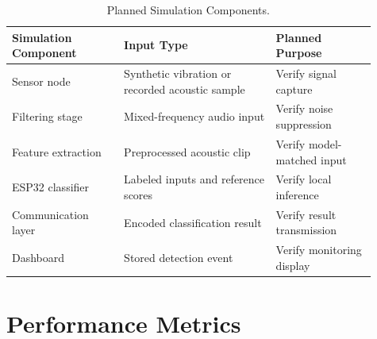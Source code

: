 \documentclass[12pt,a4paper,oneside]{memoir}
\newcommand{\newrevision}[1]{#1}
\begin{document}
\begin{table}[h]
\centering
\caption{Planned Simulation Components.}
\label{tab:simulation}
\renewcommand{\arraystretch}{1.3}
\begin{tabular}{@{} p{0.28\linewidth} p{0.38\linewidth} p{0.25\linewidth} @{}}
\toprule
\textbf{Simulation Component} & \textbf{Input Type} & \textbf{Planned Purpose} \\
\midrule
Sensor node        & Synthetic vibration or recorded acoustic sample & Verify signal capture \\
Filtering stage    & Mixed-frequency audio input                     & Verify noise suppression \\
\newrevision{Feature extraction} & \newrevision{Preprocessed acoustic clip} & \newrevision{Verify model-matched input} \\
\newrevision{ESP32 classifier} & \newrevision{Labeled inputs and reference scores} & \newrevision{Verify local inference} \\
\newrevision{Communication layer} & \newrevision{Encoded classification result} & \newrevision{Verify result transmission} \\
Dashboard          & Stored detection event                          & Verify monitoring display \\
\bottomrule
\end{tabular}
\end{table}

\section{Performance Metrics}
\label{sec:PerformanceMetrics}
\end{document}
